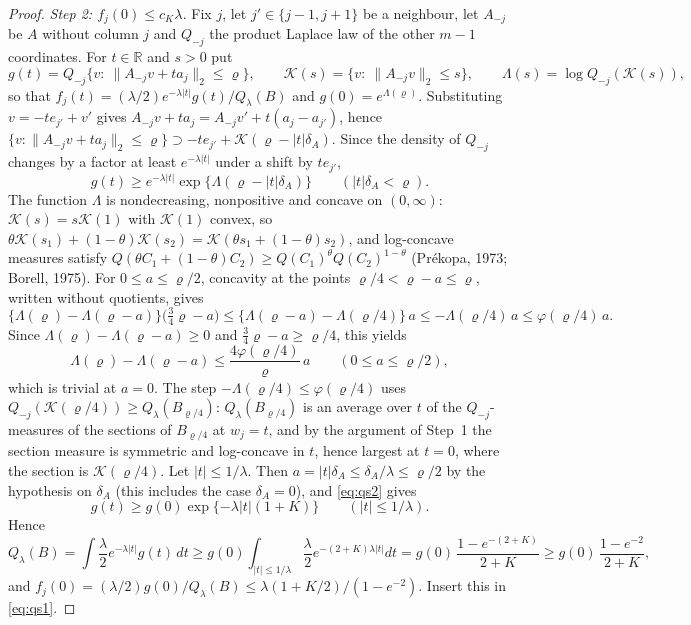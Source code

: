 \documentclass[11pt]{article}
\theoremstyle{definition}
\theoremstyle{remark}
\newcommand{\R}{\mathbb{R}}
\newcommand{\Ql}{Q_\lambda}
\begin{document}
\begin{proof}
\emph{Step 2: $f_j(0)\le c_K\lambda$.} Fix $j$, let $j'\in\{j-1,j+1\}$ be a neighbour, let $A_{-j}$ be $A$ without column $j$ and $Q_{-j}$ the product Laplace law of the other $m-1$ coordinates. For $t\in\R$ and $s>0$ put
\[
g(t)=Q_{-j}\{v:\ \|A_{-j}v+ta_j\|_2\le\varrho\},\qquad \mathcal K(s)=\{v:\ \|A_{-j}v\|_2\le s\},\qquad \Lambda(s)=\log Q_{-j}(\mathcal K(s)),
\]
so that $f_j(t)=(\lambda/2)e^{-\lambda|t|}g(t)/\Ql(B)$ and $g(0)=e^{\Lambda(\varrho)}$. Substituting $v=-te_{j'}+v'$ gives $A_{-j}v+ta_j=A_{-j}v'+t(a_j-a_{j'})$, hence $\{v:\|A_{-j}v+ta_j\|_2\le\varrho\}\supset-te_{j'}+\mathcal K(\varrho-|t|\delta_A)$. Since the density of $Q_{-j}$ changes by a factor at least $e^{-\lambda|t|}$ under a shift by $te_{j'}$,
\begin{equation}\label{eq:qs2}
g(t)\ge e^{-\lambda|t|}\exp\{\Lambda(\varrho-|t|\delta_A)\}\qquad(|t|\delta_A<\varrho).
\end{equation}
The function $\Lambda$ is nondecreasing, nonpositive and concave on $(0,\infty)$: $\mathcal K(s)=s\mathcal K(1)$ with $\mathcal K(1)$ convex, so $\theta\mathcal K(s_1)+(1-\theta)\mathcal K(s_2)=\mathcal K(\theta s_1+(1-\theta)s_2)$, and log-concave measures satisfy $Q(\theta C_1+(1-\theta)C_2)\ge Q(C_1)^\theta Q(C_2)^{1-\theta}$ (Pr\'ekopa, 1973; Borell, 1975). For $0\le a\le\varrho/2$, concavity at the points $\varrho/4<\varrho-a\le\varrho$, written without quotients, gives
\[
\bigl\{\Lambda(\varrho)-\Lambda(\varrho-a)\bigr\}\bigl(\tfrac34\varrho-a\bigr)\le\bigl\{\Lambda(\varrho-a)-\Lambda(\varrho/4)\bigr\}\,a\le-\Lambda(\varrho/4)\,a\le\varphi(\varrho/4)\,a .
\]
Since $\Lambda(\varrho)-\Lambda(\varrho-a)\ge0$ and $\tfrac34\varrho-a\ge\varrho/4$, this yields
\[
\Lambda(\varrho)-\Lambda(\varrho-a)\le\frac{4\varphi(\varrho/4)}{\varrho}\,a\qquad(0\le a\le\varrho/2),
\]
which is trivial at $a=0$. The step $-\Lambda(\varrho/4)\le\varphi(\varrho/4)$ uses $Q_{-j}(\mathcal K(\varrho/4))\ge\Ql(B_{\varrho/4})$: $\Ql(B_{\varrho/4})$ is an average over $t$ of the $Q_{-j}$-measures of the sections of $B_{\varrho/4}$ at $w_j=t$, and by the argument of Step~1 the section measure is symmetric and log-concave in $t$, hence largest at $t=0$, where the section is $\mathcal K(\varrho/4)$. Let $|t|\le1/\lambda$. Then $a=|t|\delta_A\le\delta_A/\lambda\le\varrho/2$ by the hypothesis on $\delta_A$ (this includes the case $\delta_A=0$), and \eqref{eq:qs2} gives
\[
g(t)\ge g(0)\exp\{-\lambda|t|(1+K)\}\qquad(|t|\le1/\lambda).
\]
Hence
\[
\Ql(B)=\int\frac\lambda2e^{-\lambda|t|}g(t)\,dt\ge g(0)\int_{|t|\le1/\lambda}\frac\lambda2e^{-(2+K)\lambda|t|}dt=g(0)\,\frac{1-e^{-(2+K)}}{2+K}\ge g(0)\,\frac{1-e^{-2}}{2+K},
\]
and $f_j(0)=(\lambda/2)g(0)/\Ql(B)\le\lambda(1+K/2)/(1-e^{-2})$. Insert this in \eqref{eq:qs1}.
\end{proof}
\end{document}
